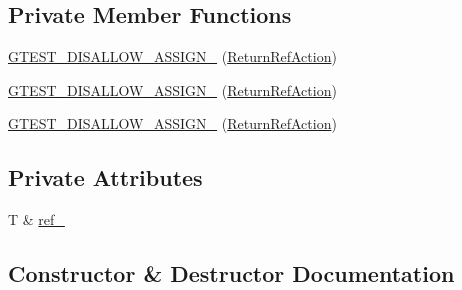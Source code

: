 \subsection*{Private Member Functions}
\begin{DoxyCompactItemize}
\item 
\mbox{\hyperlink{classtesting_1_1internal_1_1_return_ref_action_a7b26c9c4e02cdf2b82f76f32f8b8e053}{G\+T\+E\+S\+T\+\_\+\+D\+I\+S\+A\+L\+L\+O\+W\+\_\+\+A\+S\+S\+I\+G\+N\+\_\+}} (\mbox{\hyperlink{classtesting_1_1internal_1_1_return_ref_action}{Return\+Ref\+Action}})
\item 
\mbox{\hyperlink{classtesting_1_1internal_1_1_return_ref_action_a7b26c9c4e02cdf2b82f76f32f8b8e053}{G\+T\+E\+S\+T\+\_\+\+D\+I\+S\+A\+L\+L\+O\+W\+\_\+\+A\+S\+S\+I\+G\+N\+\_\+}} (\mbox{\hyperlink{classtesting_1_1internal_1_1_return_ref_action}{Return\+Ref\+Action}})
\item 
\mbox{\hyperlink{classtesting_1_1internal_1_1_return_ref_action_a7b26c9c4e02cdf2b82f76f32f8b8e053}{G\+T\+E\+S\+T\+\_\+\+D\+I\+S\+A\+L\+L\+O\+W\+\_\+\+A\+S\+S\+I\+G\+N\+\_\+}} (\mbox{\hyperlink{classtesting_1_1internal_1_1_return_ref_action}{Return\+Ref\+Action}})
\end{DoxyCompactItemize}
\subsection*{Private Attributes}
\begin{DoxyCompactItemize}
\item 
T \& \mbox{\hyperlink{classtesting_1_1internal_1_1_return_ref_action_ad07472e358d3315bb088254f925687c2}{ref\+\_\+}}
\end{DoxyCompactItemize}


\subsection{Constructor \& Destructor Documentation}
\mbox{\label{classtesting_1_1internal_1_1_return_ref_action_a1384b1cd78f3069f0493e2302f143701}} 
